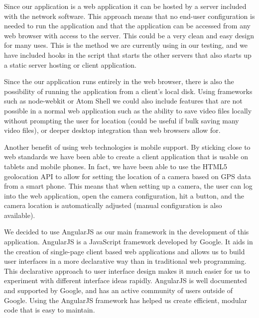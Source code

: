 Since our application is a web application it can be hosted by a server included
with the network software. This approach means that no end-user configuration is
needed to run the application and that the application can be accessed from any
web browser with access to the server. This could be a very clean and easy
design for many uses. This is the method we are currently using in our testing,
and we have included hooks in the script that starts the other servers that also
starts up a static server hosting or client application.

Since the our application runs entirely in the web browser, there is also the
possibility of running the application from a client's local disk. Using
frameworks such as node-webkit\cite{nw_home} or Atom Shell\cite{atom_home} we
could also include features that are not possible in a normal web application
such as the ability to save video files locally without prompting the user for
location (could be useful if bulk saving many video files), or deeper desktop
integration than web browsers allow for.

Another benefit of using web technologies is mobile support. By sticking close
to web standards we have been able to create a client application that is usable
on tablets and mobile phones. In fact, we have been able to use the HTML5
geolocation API to allow for setting the location of a camera based on GPS data
from a smart phone. This means that when setting up a camera, the user can log
into the web application, open the camera configuration, hit a button, and the
camera location is automatically adjusted (manual configuration is also
available).

We decided to use AngularJS\cite{angular_home} as our main framework in the
development of this application. AngularJS is a JavaScript framework developed
by Google. It aids in the creation of single-page client based web applications
and allows us to build user interfaces in a more declarative way than in
traditional web programming. This declarative approach to user interface design
makes it much easier for us to experiment with different interface ideas
rapidly. AngularJS is well documented and supported by Google, and has an active
community of users outside of Google. Using the AngularJS framework has helped
us create efficient, modular code that is easy to maintain.

